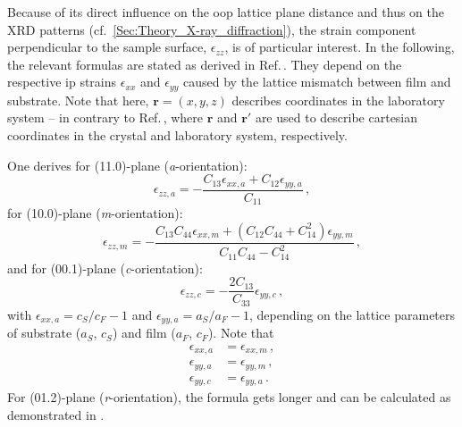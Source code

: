 Because of its direct influence on the \gls{oop} lattice plane distance and thus on the \gls{XRD} patterns (cf.~\ref{Sec:Theory_X-ray_diffraction}), the strain component perpendicular to the sample surface, $\epsilon_{zz}$, is of particular interest. %
In the following, the relevant formulas are stated as derived in Ref.\,\cite{grundmann2018}.
They depend on the respective \gls{ip} strains $\epsilon_{xx}$ and $\epsilon_{yy}$ caused by the lattice mismatch between film and substrate.
Note that here, $\mathbf{r}=(x,y,z)$ describes coordinates in the laboratory system -- in contrary to Ref.\,\cite{grundmann2018}, where $\mathbf{r}$ and $\mathbf{r}'$ are used to describe cartesian coordinates in the crystal and laboratory system, respectively.

One derives for (11.0)-plane (\textit{a}-orientation):
\begin{equation}
    \label{euq:e3-a}
    \epsilon_{zz,a}=-\frac{C_{13}\epsilon_{xx,a}+C_{12}\epsilon_{yy,a}}{C_{11}} \,,
\end{equation}
for (10.0)-plane (\textit{m}-orientation):
\begin{equation}
    \label{euq:e3-m}
    \epsilon_{zz,m}=-\frac{C_{13}C_{44}\epsilon_{xx,m}+(C_{12}C_{44}+C_{14}^2)\epsilon_{yy,m}}{C_{11}C_{44}-C_{14}^2} \,,
\end{equation}
and for (00.1)-plane (\textit{c}-orientation):
\begin{equation}
    \label{euq:e3-c}
    \epsilon_{zz,c}=-\frac{2C_{13}}{C_{33}}\epsilon_{yy,c} \,,
\end{equation}
with $\epsilon_{xx,a}=c_S/c_F-1$ and $\epsilon_{yy,a}=a_S/a_F-1$, depending on the lattice parameters of substrate ($a_S$, $c_S$) and film ($a_F$, $c_F$).
Note that 
\begin{align*}
    \epsilon_{xx,a}&= \epsilon_{xx,m}\,,\\
    \epsilon_{yy,a}&= \epsilon_{yy,m}\,,\\
    \epsilon_{yy,c}&= \epsilon_{yy,a}\,.
\end{align*}
For (01.2)-plane (\textit{r}-orientation), the formula gets longer and can be calculated as demonstrated in \textcite{grundmann2020}.
